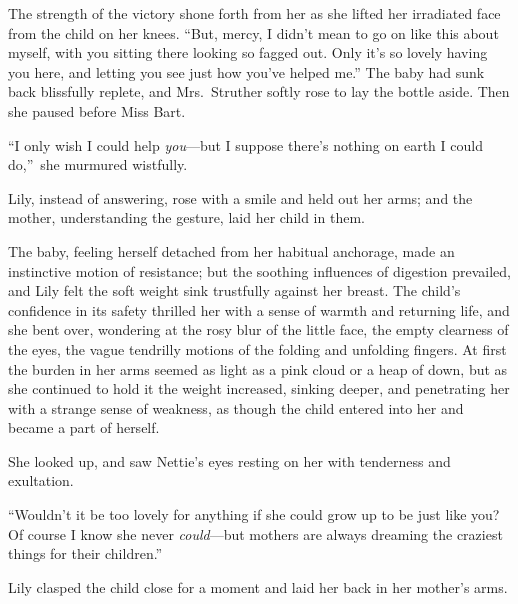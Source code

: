 \documentclass[12pt,a4paper]{book}
\begin{document}
The strength of the victory shone forth from her as she lifted
her irradiated face from the child on her knees. ``But, mercy, I
didn't mean to go on like this about myself, with you sitting
there looking so fagged out. Only it's so lovely having you here,
and letting you see just how you've helped me.'' The baby had sunk
back blissfully replete, and Mrs.\ Struther softly rose to
lay the bottle aside. Then she paused before Miss Bart.





``I only wish I could help \textit{you}---but I suppose there's nothing on
earth I could do,''\ she murmured wistfully.





Lily, instead of answering, rose with a smile and held out her
arms; and the mother, understanding the gesture, laid her child
in them.





The baby, feeling herself detached from her habitual anchorage,
made an instinctive motion of resistance; but the soothing
influences of digestion prevailed, and Lily felt the soft weight
sink trustfully against her breast. The child's confidence in its
safety thrilled her with a sense of warmth and returning life,
and she bent over, wondering at the rosy blur of the little face,
the empty clearness of the eyes, the vague tendrilly motions of
the folding and unfolding fingers. At first the burden in her
arms seemed as light as a pink cloud or a heap of down, but as
she continued to hold it the weight increased, sinking deeper,
and penetrating her with a strange sense of weakness, as though
the child entered into her and became a part of herself.





She looked up, and saw Nettie's eyes resting on her with
tenderness and exultation.





``Wouldn't it be too lovely for anything if she could grow up to
be just like you? Of course I know she never \textit{could}---but mothers
are always dreaming the craziest things for their children.''





Lily clasped the child close for a moment and laid her back in
her
mother's arms.
\end{document}
